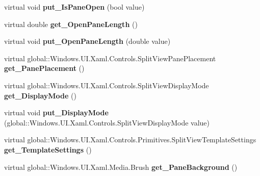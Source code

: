 \begin{DoxyCompactItemize}
virtual void {\bfseries put\+\_\+\+Is\+Pane\+Open} (bool value)
\item 
\mbox{\label{class_windows_1_1_u_i_1_1_xaml_1_1_controls_1_1_split_view_a854842b7daf878725df6c255d01fc31e}} 
virtual double {\bfseries get\+\_\+\+Open\+Pane\+Length} ()
\item 
\mbox{\label{class_windows_1_1_u_i_1_1_xaml_1_1_controls_1_1_split_view_a5fbb9c9badd343958b2257ca2eb5a0f2}} 
virtual void {\bfseries put\+\_\+\+Open\+Pane\+Length} (double value)
\item 
\mbox{\label{class_windows_1_1_u_i_1_1_xaml_1_1_controls_1_1_split_view_ae136f8940aa8871c0d28d1eb593a4a29}} 
virtual global\+::\+Windows.\+U\+I.\+Xaml.\+Controls.\+Split\+View\+Pane\+Placement {\bfseries get\+\_\+\+Pane\+Placement} ()
\item 
\mbox{\label{class_windows_1_1_u_i_1_1_xaml_1_1_controls_1_1_split_view_af29bc8fd9090a72aea2eaf4b3f2c0a30}} 
virtual global\+::\+Windows.\+U\+I.\+Xaml.\+Controls.\+Split\+View\+Display\+Mode {\bfseries get\+\_\+\+Display\+Mode} ()
\item 
\mbox{\label{class_windows_1_1_u_i_1_1_xaml_1_1_controls_1_1_split_view_a1b48b7569672c2b406106e1b2c94556b}} 
virtual void {\bfseries put\+\_\+\+Display\+Mode} (global\+::\+Windows.\+U\+I.\+Xaml.\+Controls.\+Split\+View\+Display\+Mode value)
\item 
\mbox{\label{class_windows_1_1_u_i_1_1_xaml_1_1_controls_1_1_split_view_add67530a837afbb62bb137f7cc503647}} 
virtual global\+::\+Windows.\+U\+I.\+Xaml.\+Controls.\+Primitives.\+Split\+View\+Template\+Settings {\bfseries get\+\_\+\+Template\+Settings} ()
\item 
\mbox{\label{class_windows_1_1_u_i_1_1_xaml_1_1_controls_1_1_split_view_a47635cfeb856accea21323a3ca5eb9da}} 
virtual global\+::\+Windows.\+U\+I.\+Xaml.\+Media.\+Brush {\bfseries get\+\_\+\+Pane\+Background} ()

\end{DoxyCompactItemize}
